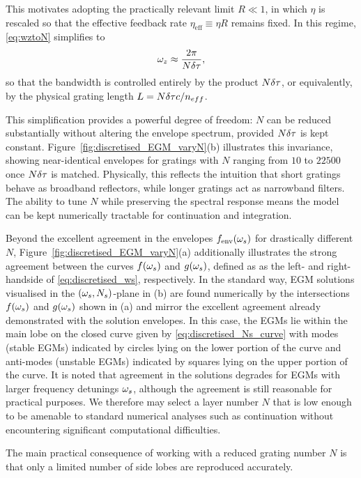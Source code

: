 This motivates adopting the practically relevant limit $R\ll1$, in which $\eta$ is rescaled so that the effective feedback rate $\eta_\text{eff} \equiv \eta R$ remains fixed.
In this regime, \eqref{eq:wztoN} simplifies to
%
\begin{equation}
\label{eq:wz_approx}
\omega_z \approx \frac{2\pi}{N \delta \tau},
\end{equation}
%
so that the bandwidth is controlled entirely by the product $N\delta \tau$, or equivalently, by the physical grating length $L = N \delta \tau c/n_{eff}$.
%
\par
%
This simplification provides a powerful degree of freedom: $N$ can be reduced substantially without altering the envelope spectrum, provided $N\delta \tau$ is kept constant.
Figure~\ref{fig:discretised_EGM_varyN}(b) illustrates this invariance, showing near-identical envelopes for gratings with $N$ ranging from $10$ to $22500$ once $N\delta \tau$ is matched.
Physically, this reflects the intuition that short gratings behave as broadband reflectors, while longer gratings act as narrowband filters.
The ability to tune $N$ while preserving the spectral response means the model can be kept numerically tractable for continuation and integration.
%
\par
%
Beyond the excellent agreement in the envelopes $f_\text{env}(\omega_s)$ for drastically different $N$, Figure~\ref{fig:discretised_EGM_varyN}(a) additionally illustrates the strong agreement between the curves $f(\omega_s)$ and $g(\omega_s)$, defined as as the left- and right-handside of \eqref{eq:discretised_ws}, respectively.
In the standard way, EGM solutions visualised in the $(\omega_s, N_s)$-plane in (b) are found numerically by the intersections $f(\omega_s)$ and $g(\omega_s)$ shown in (a) and mirror the excellent agreement already demonstrated with the solution envelopes.
In this case, the EGMs lie within the main lobe on the closed curve given by \eqref{eq:discretised_Ns_curve} with modes (stable EGMs) indicated by circles lying on the lower portion of the curve and anti-modes (unstable EGMs) indicated by squares lying on the upper portion of the curve.
It is noted that agreement in the solutions degrades for EGMs with larger frequency detunings $\omega_s$, although the agreement is still reasonable for practical purposes.
We therefore may select a layer number $N$ that is low enough to be amenable to standard numerical analyses such as continuation without encountering significant computational difficulties.
%
\par
%
The main practical consequence of working with a reduced grating number $N$ is that only a limited number of side lobes are reproduced accurately.

